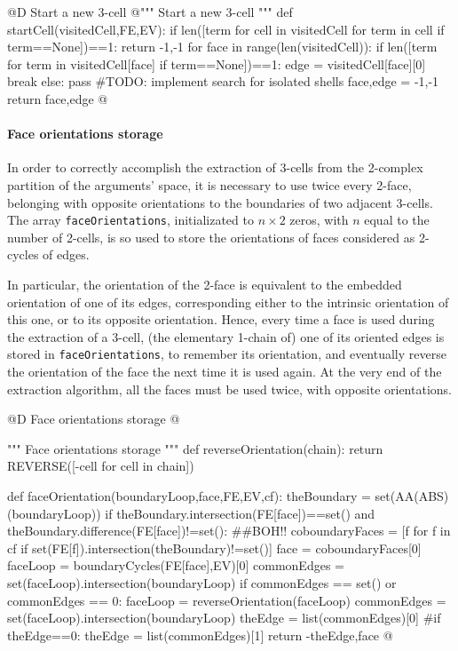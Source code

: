 \documentclass[11pt,oneside]{article}    %
\begin{document}
@D Start a new 3-cell
@{""" Start a new 3-cell """
def startCell(visitedCell,FE,EV):
    if len([term for cell in visitedCell for term in cell if term==None])==1: return -1,-1
    for face in range(len(visitedCell)):
        if len([term for term in visitedCell[face] if term==None])==1:
            edge = visitedCell[face][0]
            break
        else: pass  #TODO: implement search for isolated shells
        face,edge = -1,-1
    return face,edge
@}

\paragraph{Face orientations storage}

In order to correctly accomplish the extraction of 3-cells from the 2-complex partition of the arguments' space, it is necessary to use twice every 2-face, belonging with opposite orientations to the boundaries of two adjacent 3-cells. The array \texttt{faceOrientations}, initializated to $n\times 2$ zeros, with $n$ equal to the number of 2-cells, is so used to store the orientations of faces considered as 2-cycles of edges. 

In particular, the orientation of the 2-face is equivalent to the embedded orientation of one of its edges, corresponding either to the intrinsic orientation of this one, or to its opposite orientation. Hence, every time a face is used during the extraction of a 3-cell, (the elementary 1-chain of) one of its oriented edges is stored in \texttt{faceOrientations}, to remember its orientation, and eventually reverse the orientation of the face the next time it is used again. At the very end of the extraction algorithm, all the faces must be used twice, with opposite orientations. 

@D Face orientations storage
@{""" Face orientations storage """
def reverseOrientation(chain):
    return REVERSE([-cell for cell in chain])

def faceOrientation(boundaryLoop,face,FE,EV,cf):
    theBoundary = set(AA(ABS)(boundaryLoop))
    if theBoundary.intersection(FE[face])==set() and theBoundary.difference(FE[face])!=set(): ##BOH!!
        coboundaryFaces = [f for f in cf if set(FE[f]).intersection(theBoundary)!=set()]
        face = coboundaryFaces[0]            
    faceLoop = boundaryCycles(FE[face],EV)[0]
    commonEdges = set(faceLoop).intersection(boundaryLoop)
    if commonEdges == set() or commonEdges == {0}: 
        faceLoop = reverseOrientation(faceLoop)
        commonEdges = set(faceLoop).intersection(boundaryLoop)
    theEdge = list(commonEdges)[0]
    #if theEdge==0: theEdge = list(commonEdges)[1]
    return -theEdge,face
@}
\end{document}
